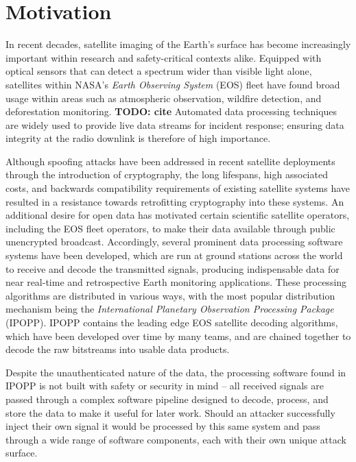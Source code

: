 \section{Motivation}


In recent decades, satellite imaging of the Earth's surface has become increasingly important within research and safety-critical contexts alike.
Equipped with optical sensors that can detect a spectrum wider than visible light alone, satellites within NASA's \textit{Earth Observing System} (EOS) fleet have found broad usage within areas such as atmospheric observation, wildfire detection, and deforestation monitoring. \textbf{TODO: cite}
Automated data processing techniques are widely used to provide live data streams for incident response; ensuring data integrity at the radio downlink is therefore of high importance.

Although spoofing attacks have been addressed in recent satellite deployments through the introduction of cryptography, the long lifespans, high associated costs, and backwards compatibility requirements of existing satellite systems have resulted in a resistance towards retrofitting cryptography into these systems.
An additional desire for open data has motivated certain scientific satellite operators, including the EOS fleet operators, to make their data available through public unencrypted broadcast.
Accordingly, several prominent data processing software systems have been developed, which are run at ground stations across the world to receive and decode the transmitted signals, producing indispensable data for near real-time and retrospective Earth monitoring applications.
These processing algorithms are distributed in various ways, with the most popular distribution mechanism being the \textit{International Planetary Observation Processing Package} (IPOPP). %
IPOPP contains the leading edge EOS satellite decoding algorithms, which have been developed over time by many teams, and are chained together to decode the raw bitstreams into usable data products.

Despite the unauthenticated nature of the data, the processing software found in IPOPP is not built with safety or security in mind -- all received signals are passed through a complex software pipeline designed to decode, process, and store the data to make it useful for later work.
Should an attacker successfully inject their own signal it would be processed by this same system and pass through a wide range of software components, each with their own unique attack surface.

